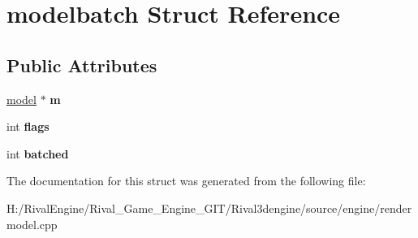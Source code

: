 \hypertarget{structmodelbatch}{}\section{modelbatch Struct Reference}
\label{structmodelbatch}
\subsection*{Public Attributes}
\begin{DoxyCompactItemize}
\item 
\mbox{\label{structmodelbatch_a3234c386318346448a67525674bcc823}} 
\hyperlink{structmodel}{model} $\ast$ {\bfseries m}
\item 
\mbox{\label{structmodelbatch_a9c73428cfb270833e4b2e79bb6ed6fc2}} 
int {\bfseries flags}
\item 
\mbox{\label{structmodelbatch_a6519cd6018674735d4c31eaa58c067ca}} 
int {\bfseries batched}
\end{DoxyCompactItemize}


The documentation for this struct was generated from the following file\+:\begin{DoxyCompactItemize}
\item 
H\+:/\+Rival\+Engine/\+Rival\+\_\+\+Game\+\_\+\+Engine\+\_\+\+G\+I\+T/\+Rival3dengine/source/engine/rendermodel.\+cpp\end{DoxyCompactItemize}
